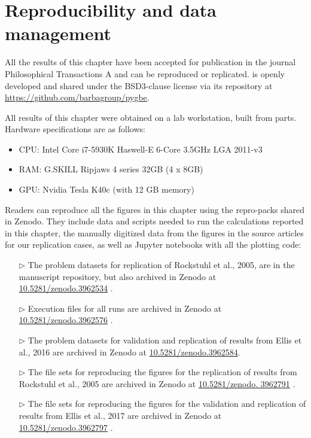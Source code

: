 \section{Reproducibility and data management} \label{sec:repro_val}
 
All the results of this chapter have been accepted for publication in the journal 
Philosophical Transactions A \cite{ClementiBarba2020} and can be reproduced or replicated. \pygbe is openly developed and 
shared under the BSD3-clause license via its repository at \url{https://github.com/barbagroup/pygbe}.

All results of this chapter were obtained on a lab workstation, built from parts. Hardware specifications are as follows:

\begin{itemize}
  \item CPU: Intel Core i7-5930K Haswell-E 6-Core 3.5GHz LGA 2011-v3
  \item RAM: G.SKILL Ripjaws 4 series 32GB (4 x 8GB)
  \item GPU: Nvidia Tesla K40c (with 12 GB memory)
\end{itemize}

Readers can reproduce all the figures in this chapter using the repro-packs shared in Zenodo. They include 
data and scripts needed to run the calculations reported in this chapter, the manually digitized data from the figures
in the source articles for our replication cases, as well as Jupyter notebooks with all the plotting code:

\begin{itemize}

\item[$\triangleright$] The problem datasets for replication of Rockstuhl et al., 2005, are in the manuscript repository, but also archived in Zenodo  at \href{https://doi.org/10.5281/zenodo.3962534}{10.5281/zenodo.3962534}  \cite{ClementiBarba2020-Zen_a}.

\item[$\triangleright$] Execution files for all runs are archived in Zenodo at \href{https://doi.org/10.5281/zenodo.3962576}{10.5281/zenodo.3962576} \cite{ClementiBarba2020-Zen_b}.

\item[$\triangleright$] The problem datasets for validation and replication of results from Ellis et al., 2016 are archived in Zenodo at \href{https://doi.org/10.5281/zenodo.3962584}{10.5281/zenodo.3962584}\cite{ClementiBarba2020-Zen_c}.

\item[$\triangleright$] The file sets for reproducing the figures for the replication of results from Rockstuhl et al., 2005 are archived in Zenodo at \href{https://doi.org/10.5281/zenodo. 3962791}{10.5281/zenodo. 3962791} \cite{ClementiBarba2020-Zen_d}.

\item[$\triangleright$] The file sets for reproducing the figures for the validation and replication of results from Ellis et al., 2017 are archived in Zenodo at \href{https://doi.org/3962797/zenodo.3962791}{10.5281/zenodo.3962797} \cite{ClementiBarba2020-Zen_e}.

\end{itemize}
